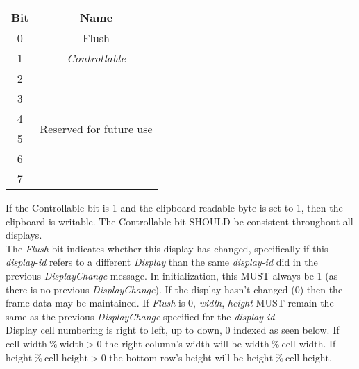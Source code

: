 \begin{center}
    \begin{tabular}{|c|c|}
        \hline
        \textbf{Bit} & \textbf{Name}                               \\
        \hline
        0            & Flush                                       \\
        \hline
        1            & \emph{Controllable}                         \\
        \hline
        2            & \multirow{6}{10em}{Reserved for future use} \\
        3            &                                             \\
        4            &                                             \\
        5            &                                             \\
        6            &                                             \\
        7            &                                             \\
        \hline
    \end{tabular}
\end{center}

If the Controllable bit is 1 and the clipboard-readable byte is set to 1, then the clipboard is
writable. The Controllable bit SHOULD be consistent throughout all displays.\\

The \emph{Flush} bit indicates whether this display has changed, specifically if this \emph{display-id} refers to
a different \emph{Display} than the same \emph{display-id} did in the previous \emph{DisplayChange} message. In
initialization, this MUST always be 1 (as there is no previous \emph{DisplayChange}). If the display hasn't
changed (0) then the frame data may be maintained. If \emph{Flush} is 0, \emph{width}, \emph{height} MUST remain
the same as the previous \emph{DisplayChange} specified for the \emph{display-id}.\\


Display cell numbering is right to left, up to down, 0 indexed as seen below. If $\text{cell-width}\ \%\
\text{width} > 0$ the right column's width will be $\text{width}\ \%\ \text{cell-width}$. If $\text{height}\
\%\ \text{cell-height} > 0$ the bottom row's height will be $\text{height}\ \%\ \text{cell-height}$.

